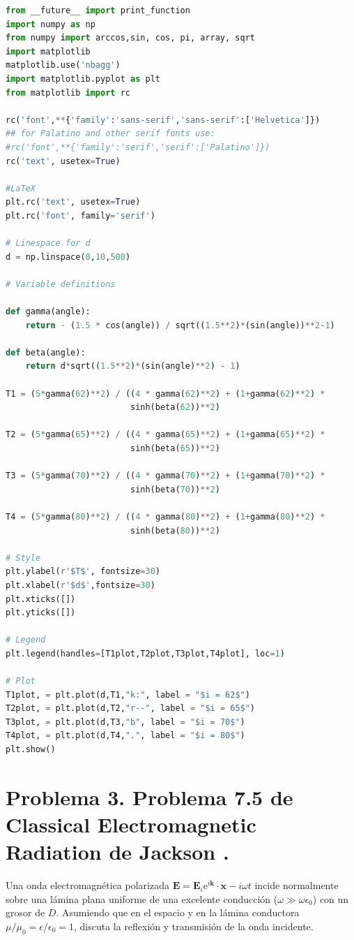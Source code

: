 \documentclass[a4paper,11pt]{article}
\numberwithin{equation}{section}
\newcommand{\euler}{\mathrm{e}}
\begin{document}
\begin{lstlisting}[language=Python]
from __future__ import print_function
import numpy as np
from numpy import arccos,sin, cos, pi, array, sqrt
import matplotlib
matplotlib.use('nbagg')
import matplotlib.pyplot as plt
from matplotlib import rc

rc('font',**{'family':'sans-serif','sans-serif':['Helvetica']})
## for Palatino and other serif fonts use:
#rc('font',**{'family':'serif','serif':['Palatino']})
rc('text', usetex=True)

#LaTeX
plt.rc('text', usetex=True)
plt.rc('font', family='serif')

# Linespace for d
d = np.linspace(0,10,500)

# Variable definitions

def gamma(angle):
    return - (1.5 * cos(angle)) / sqrt((1.5**2)*(sin(angle))**2-1)

def beta(angle):
    return d*sqrt((1.5**2)*(sin(angle)**2) - 1)

T1 = (5*gamma(62)**2) / ((4 * gamma(62)**2) + (1+gamma(62)**2) * 
                         sinh(beta(62))**2)

T2 = (5*gamma(65)**2) / ((4 * gamma(65)**2) + (1+gamma(65)**2) * 
                         sinh(beta(65))**2)

T3 = (5*gamma(70)**2) / ((4 * gamma(70)**2) + (1+gamma(70)**2) * 
                         sinh(beta(70))**2)

T4 = (5*gamma(80)**2) / ((4 * gamma(80)**2) + (1+gamma(80)**2) * 
                         sinh(beta(80))**2)

# Style
plt.ylabel(r'$T$', fontsize=30)
plt.xlabel(r'$d$',fontsize=30)
plt.xticks([])
plt.yticks([])

# Legend
plt.legend(handles=[T1plot,T2plot,T3plot,T4plot], loc=1)

# Plot
T1plot, = plt.plot(d,T1,"k:", label = "$i = 62$")
T2plot, = plt.plot(d,T2,"r--", label = "$i = 65$")
T3plot, = plt.plot(d,T3,"b", label = "$i = 70$")
T4plot, = plt.plot(d,T4,".", label = "$i = 80$")
plt.show()
\end{lstlisting}

\newpage

\section{Problema 3. Problema 7.5 de Classical Electromagnetic Radiation
de Jackson \cite{jackson}.}

Una onda electromagnética polarizada $\mathbf{E} = \mathbf{E}_i \euler^{i\mathbf{k}} 
\cdot \mathbf{x} - i\omega t$ incide normalmente sobre una lámina plana uniforme 
de una excelente conducción ($\omega \gg \omega \epsilon_0$) con un grosor de $D$. 
Asumiendo que en el espacio y en la lámina conductora $\mu/\mu_0 = \epsilon/\epsilon_0 
= 1$, discuta la reflexión y transmisión de la onda incidente. 
\end{document}
